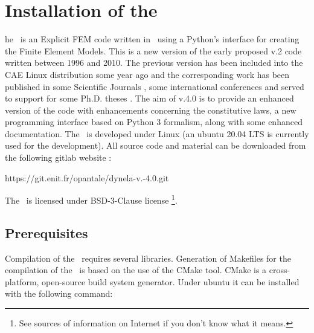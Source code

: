 %
%
%
\chapter{Installation of the \DynELA}\label{Chapter!Installation}

\startcontents[chapters]
\printmyminitoc[1]he \DynELA~is an Explicit FEM code written in \Cpp~using a Python's interface for creating the Finite Element Models. This is a new version of the early proposed v.2 code written between 1996 and 2010. The previous version has been included into the CAE Linux distribution some year ago and the corresponding work has been published in some Scientific Journals \cite{
pantale_object-oriented_2002,
pantale_development_2004,
pantale_parallelization_2005,
menanteau_methodology_2006,
nistor_numerical_2007,
nistor_numerical_2008,
pantale_rp_2020}
, some international conferences \cite{
menanteau_coupled_2005,
nistor_modeling_2005,
pantale_strategies_2005,
pantale_developpement_2004,
pantale_developpement_1999,
pantale_development_2002}
 and served to support for some Ph.D. theses \cite{
menanteau_developpement_2004,
nistor_identification_2005}
. The aim of v.4.0 is to provide an enhanced version of the code with enhancements concerning the constitutive laws, a new programming interface based on Python 3 formalism, along with some enhanced documentation.
The \DynELA~is developed under Linux (an ubuntu 20.04 LTS is currently used for the development). All source code and material can be downloaded from the following gitlab
 website
:

\hspace*{1cm}\textsf{https://git.enit.fr/opantale/dynela-v.-4.0.git}

The \DynELA~is licensed under BSD-3-Clause license \footnote{See sources of information on Internet if you don't know what it means.}.

\section{Prerequisites}

Compilation of the \DynELA~requires several libraries.
Generation of Makefiles for the compilation of the \DynELA~is based on the use of the CMake tool. CMake is a cross-platform, open-source build system generator. Under ubuntu it can be installed with the following command:

